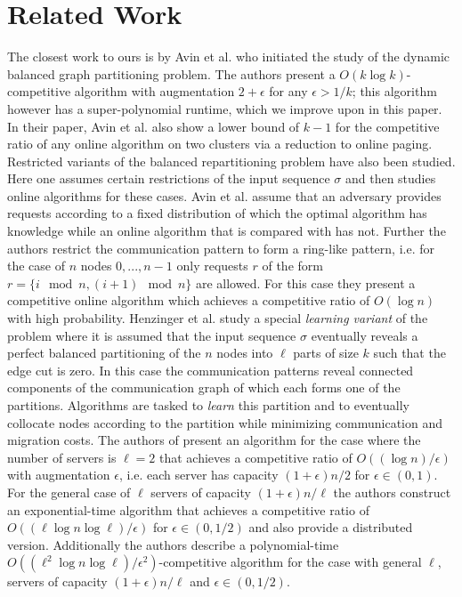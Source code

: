 \documentclass[a4paper,UKenglish,cleveref, autoref, thm-restate,authorcolumns]{lipics-v2019}
\newcommand{\opt}{\text{O{\scriptsize PT}}}
\begin{document}
\section{Related Work}
\label{sec:related_work}

The closest work to ours is by Avin et al. \cite{Avin2015} 
who initiated the study of the dynamic balanced graph partitioning 
problem. The authors present a $O(k \log k)$-competitive algorithm 
with augmentation $2+\epsilon$ for any $\epsilon>1/k$;
this algorithm however has a super-polynomial runtime,
which we improve upon in this paper.  
In their paper, Avin et al. also show a lower bound of $k-1$ for the competitive ratio of any online algorithm 
on two clusters via a reduction to online paging. 
Restricted variants of the balanced repartitioning problem have also been studied. Here one assumes certain restrictions of the input sequence $\sigma$ and then studies online algorithms for these cases. 
Avin et al. \cite{Avin2018} 
assume that an adversary provides requests according to a fixed distribution of which the optimal algorithm \opt{} has knowledge while an online algorithm that is compared with \opt{} has not. Further the authors restrict the communication pattern to form a ring-like pattern, i.e. for the case of $n$ nodes $0,...,n-1$ only requests $r$ of the form $r=\{i \mod n, (i+1)\mod n\}$ are allowed. For this case they present a competitive online algorithm which achieves a competitive ratio of $O(\log n)$ with high probability.	
Henzinger et al. \cite{Henzinger2019} 
study a special \textit{learning variant} of the problem 
where it is assumed that the input sequence $\sigma$ eventually reveals a perfect balanced partitioning of the $n$ nodes into $\ell$ parts of size $k$ such that the edge cut is zero. In this case the communication patterns reveal connected components of the communication graph of which each forms one of the partitions. Algorithms are tasked to \textit{learn} this partition and to eventually collocate nodes according to the partition while minimizing communication and migration costs.
The authors of \cite{Henzinger2019} present an algorithm for the case where the number of servers is $\ell=2$ that achieves a competitive ratio of $O((\log n)/\epsilon)$ with augmentation $\epsilon$, i.e. each server has capacity $(1+\epsilon)n/2$ for $\epsilon\in(0,1)$.
For the general case of $\ell$ servers of capacity $(1+\epsilon)n/\ell$ the authors construct an exponential-time algorithm that achieves a competitive ratio of $O((\ell\log n \log \ell)/\epsilon)$ for $\epsilon\in(0,1/2)$ and also provide a distributed version.
Additionally the authors describe a polynomial-time $O((\ell^2\log n\log \ell)/\epsilon^2)$-competitive algorithm for the case with general $\ell$, servers of capacity $(1+\epsilon)n/\ell$ and $\epsilon\in(0,1/2)$.
\end{document}

